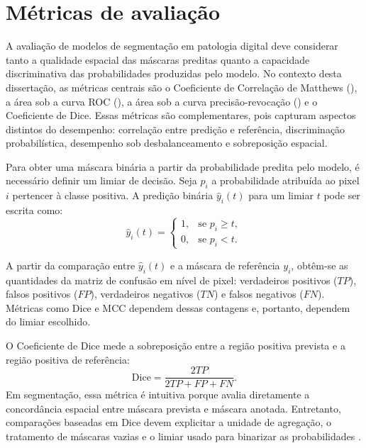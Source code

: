 \section{Métricas de avaliação}\label{sec:metricas_reprodutibilidade}

A avaliação de modelos de segmentação em patologia digital deve considerar tanto
a qualidade espacial das máscaras preditas quanto a capacidade discriminativa
das probabilidades produzidas pelo modelo. No contexto desta dissertação, as
métricas centrais são o Coeficiente de Correlação de Matthews
(), a área sob a curva ROC
(),
a área sob a curva precisão-revocação
() e o Coeficiente
de Dice. Essas métricas são complementares, pois capturam aspectos distintos do
desempenho: correlação entre predição e referência, discriminação probabilística,
desempenho sob desbalanceamento e sobreposição espacial.

Para obter uma máscara binária a partir da probabilidade predita pelo modelo, é
necessário definir um limiar de decisão. Seja $p_i$ a probabilidade atribuída ao
pixel $i$ pertencer à classe positiva. A predição binária $\hat{y}_i(t)$ para um
limiar $t$ pode ser escrita como:
\begin{equation}\label{eq:threshold-prediction}
    \hat{y}_i(t) =
    \begin{cases}
        1, & \text{se } p_i \geq t,\\
        0, & \text{se } p_i < t.
    \end{cases}
\end{equation}

A partir da comparação entre $\hat{y}_i(t)$ e a máscara de referência $y_i$,
obtêm-se as quantidades da matriz de confusão em nível de pixel: verdadeiros
positivos ($TP$), falsos positivos ($FP$), verdadeiros negativos ($TN$) e falsos
negativos ($FN$). Métricas como Dice e MCC dependem dessas contagens e,
portanto, dependem do limiar escolhido.

O Coeficiente de Dice mede a sobreposição entre a região positiva prevista e a
região positiva de referência:
\begin{equation}\label{eq:dice-revisao}
    \mathrm{Dice} =
    \frac{2TP}{2TP+FP+FN}.
\end{equation}
Em segmentação, essa métrica é intuitiva porque avalia diretamente a
concordância espacial entre máscara prevista e máscara anotada. Entretanto,
comparações baseadas em Dice devem explicitar a unidade de agregação, o
tratamento de máscaras vazias e o limiar usado para binarizar as probabilidades
\cite{seghier2024dice}.

